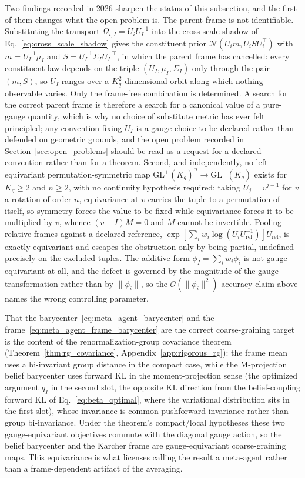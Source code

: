 \documentclass[11pt]{article}
\begin{document}
Two findings recorded in 2026 sharpen the status of this subsection, and the first of them changes what the open problem is. The parent frame is not identifiable. Substituting the transport $\Omega_{i,I} = U_i U_I^{-1}$ into the cross-scale shadow of Eq.~\eqref{eq:cross_scale_shadow} gives the constituent prior $\mathcal{N}(U_i m, U_i S U_i^\top)$ with $m = U_I^{-1}\mu_I$ and $S = U_I^{-1}\Sigma_I U_I^{-\top}$, in which the parent frame has cancelled: every constituent law depends on the triple $(U_I, \mu_I, \Sigma_I)$ only through the pair $(m, S)$, so $U_I$ ranges over a $K_q^2$-dimensional orbit along which nothing observable varies. Only the frame-free combination is determined. A search for the correct parent frame is therefore a search for a canonical value of a pure-gauge quantity, which is why no choice of substitute metric has ever felt principled; any convention fixing $U_I$ is a gauge choice to be declared rather than defended on geometric grounds, and the open problem recorded in Section~\ref{sec:open_problems} should be read as a request for a declared convention rather than for a theorem. Second, and independently, no left-equivariant permutation-symmetric map $\mathrm{GL}^+(K_q)^n \to \mathrm{GL}^+(K_q)$ exists for $K_q \ge 2$ and $n \ge 2$, with no continuity hypothesis required: taking $U_j = v^{j-1}$ for $v$ a rotation of order $n$, equivariance at $v$ carries the tuple to a permutation of itself, so symmetry forces the value to be fixed while equivariance forces it to be multiplied by $v$, whence $(v - I)M = 0$ and $M$ cannot be invertible. Pooling relative frames against a declared reference, $\exp[\sum_i w_i \log(U_i U_{\mathrm{ref}}^{-1})]U_{\mathrm{ref}}$, is exactly equivariant and escapes the obstruction only by being partial, undefined precisely on the excluded tuples. The additive form $\phi_I = \sum_i w_i\phi_i$ is not gauge-equivariant at all, and the defect is governed by the magnitude of the gauge transformation rather than by $\|\phi_i\|$, so the $\mathcal{O}(\|\phi_i\|^2)$ accuracy claim above names the wrong controlling parameter.

That the barycenter~\eqref{eq:meta_agent_barycenter} and the frame~\eqref{eq:meta_agent_frame_barycenter} are the correct coarse-graining target is the content of the renormalization-group covariance theorem (Theorem~\ref{thm:rg_covariance}, Appendix~\ref{app:rigorous_rg}): the frame mean uses a bi-invariant group distance in the compact case, while the M-projection belief barycenter uses forward KL in the moment-projection sense (the optimized argument $q_I$ in the second slot, the opposite KL direction from the belief-coupling forward KL of Eq.~\eqref{eq:beta_optimal}, where the variational distribution sits in the first slot), whose invariance is common-pushforward invariance rather than group bi-invariance. Under the theorem's compact/local hypotheses these two gauge-equivariant objectives commute with the diagonal gauge action, so the belief barycenter and the Karcher frame are gauge-equivariant coarse-graining maps. This equivariance is what licenses calling the result a meta-agent rather than a frame-dependent artifact of the averaging.
\end{document}
